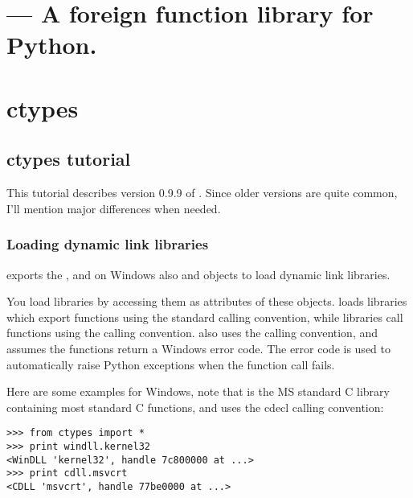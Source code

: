 \ifx\locallinewidth\undefined\newlength{\locallinewidth}\fi
\setlength{\locallinewidth}{\linewidth}
\section{ --- A foreign function library for Python.}


\section{ctypes\label{ctypes-ctypes}}


\subsection{ctypes tutorial\label{ctypes-ctypes-tutorial}}

This tutorial describes version 0.9.9 of .
Since older versions are quite common, I'll mention major differences
when needed.


\subsubsection{Loading dynamic link libraries\label{ctypes-loading-dynamic-link-libraries}}

 exports the , and on Windows also  and
 objects to load dynamic link libraries.

You load libraries by accessing them as attributes of these objects.
 loads libraries which export functions using the standard
 calling convention, while  libraries call
functions using the  calling convention.  also
uses the  calling convention, and assumes the functions
return a Windows  error code. The error code is used to
automatically raise  Python exceptions when the
function call fails.

Here are some examples for Windows, note that  is the MS
standard C library containing most standard C functions, and uses the
cdecl calling convention:
\begin{verbatim}
>>> from ctypes import *
>>> print windll.kernel32
<WinDLL 'kernel32', handle 7c800000 at ...>
>>> print cdll.msvcrt
<CDLL 'msvcrt', handle 77be0000 at ...>
\end{verbatim}

